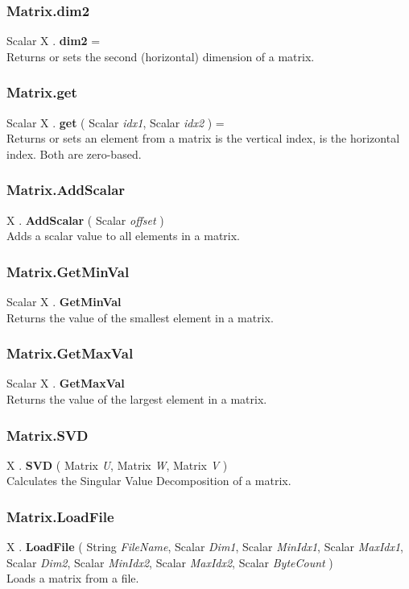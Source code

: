 \subsubsection{Matrix.dim2 \label{F:Matrix:dim2}}
Scalar X . \textbf{dim2} = \\
Returns or sets the second (horizontal) dimension of a matrix.


\subsubsection{Matrix.get \label{F:Matrix:get}}
Scalar X . \textbf{get} ( Scalar \textit{idx1}, Scalar \textit{idx2} ) = \\
Returns or sets an element from a matrix  is the vertical index,  is the horizontal index. Both are zero-based.

\subsubsection{Matrix.AddScalar \label{F:Matrix:AddScalar}}
X . \textbf{AddScalar} ( Scalar \textit{offset} ) \\
Adds a scalar value to all elements in a matrix.

\subsubsection{Matrix.GetMinVal \label{F:Matrix:GetMinVal}}
Scalar X . \textbf{GetMinVal} \\
Returns the value of the smallest element in a matrix.

\subsubsection{Matrix.GetMaxVal \label{F:Matrix:GetMaxVal}}
Scalar X . \textbf{GetMaxVal} \\
Returns the value of the largest element in a matrix.


\subsubsection{Matrix.SVD \label{F:Matrix:SVD}}
X . \textbf{SVD} ( Matrix \textit{U}, Matrix \textit{W}, Matrix \textit{V} ) \\
Calculates the Singular Value Decomposition of a matrix.

\subsubsection{Matrix.LoadFile \label{F:Matrix:LoadFile}}
X . \textbf{LoadFile} ( String \textit{FileName}, Scalar \textit{Dim1}, Scalar \textit{MinIdx1}, Scalar \textit{MaxIdx1}, Scalar \textit{Dim2}, Scalar \textit{MinIdx2}, Scalar \textit{MaxIdx2}, Scalar \textit{ByteCount} ) \\
Loads a matrix from a file.

